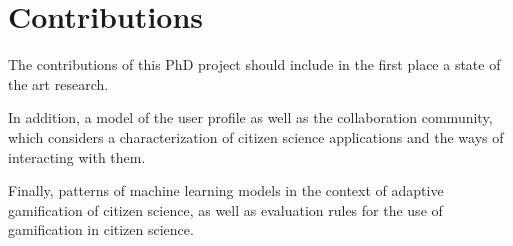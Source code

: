 \documentclass[sigconf]{acmart}
\begin{document}
\section{Contributions}


The contributions of this PhD project should include in the first place a state of the art research. 

In addition, a model of the user profile as well as the collaboration community, which considers a characterization of citizen science applications and the ways of interacting with them.

Finally, patterns of machine learning models in the context of adaptive gamification of citizen science, as well as evaluation rules for the use of gamification in citizen science.





\end{document}
